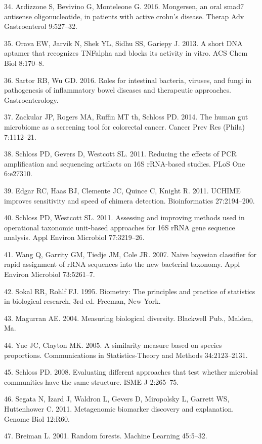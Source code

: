 \documentclass[11pt,]{article}
\begin{document}
\hypertarget{ref-ardizzone_mongersen_2016}{}
34. Ardizzone S, Bevivino G, Monteleone G. 2016. Mongersen, an oral
smad7 antisense oligonucleotide, in patients with active crohn's
disease. Therap Adv Gastroenterol 9:527--32.

\hypertarget{ref-orava_short_2013}{}
35. Orava EW, Jarvik N, Shek YL, Sidhu SS, Gariepy J. 2013. A short DNA
aptamer that recognizes TNFalpha and blocks its activity in vitro. ACS
Chem Biol 8:170--8.

\hypertarget{ref-sartor_microbesIBD_2016}{}
36. Sartor RB, Wu GD. 2016. Roles for intestinal bacteria, viruses, and
fungi in pathogenesis of inflammatory bowel diseases and therapeutic
approaches. Gastroenterology.

\hypertarget{ref-zackular_CRC_2014}{}
37. Zackular JP, Rogers MA, Ruffin MT th, Schloss PD. 2014. The human
gut microbiome as a screening tool for colorectal cancer. Cancer Prev
Res (Phila) 7:1112--21.

\hypertarget{ref-schloss_PCRartifacts_2011}{}
38. Schloss PD, Gevers D, Westcott SL. 2011. Reducing the effects of PCR
amplification and sequencing artifacts on 16S rRNA-based studies. PLoS
One 6:e27310.

\hypertarget{ref-edgar_uchime_2011}{}
39. Edgar RC, Haas BJ, Clemente JC, Quince C, Knight R. 2011. UCHIME
improves sensitivity and speed of chimera detection. Bioinformatics
27:2194--200.

\hypertarget{ref-schloss_OTUanalysis_2011}{}
40. Schloss PD, Westcott SL. 2011. Assessing and improving methods used
in operational taxonomic unit-based approaches for 16S rRNA gene
sequence analysis. Appl Environ Microbiol 77:3219--26.

\hypertarget{ref-wang_taxonomy_2007}{}
41. Wang Q, Garrity GM, Tiedje JM, Cole JR. 2007. Naive bayesian
classifier for rapid assignment of rRNA sequences into the new bacterial
taxonomy. Appl Environ Microbiol 73:5261--7.

\hypertarget{ref-sokal_biometrystats_1995}{}
42. Sokal RR, Rohlf FJ. 1995. Biometry: The principles and practice of
statistics in biological research, 3rd ed. Freeman, New York.

\hypertarget{ref-magurran_measuring_2004}{}
43. Magurran AE. 2004. Measuring biological diversity. Blackwell Pub.,
Malden, Ma.

\hypertarget{ref-yue_thetaYC_2005}{}
44. Yue JC, Clayton MK. 2005. A similarity measure based on species
proportions. Communications in Statistics-Theory and Methods
34:2123--2131.

\hypertarget{ref-schloss_commstruct_2008}{}
45. Schloss PD. 2008. Evaluating different approaches that test whether
microbial communities have the same structure. ISME J 2:265--75.

\hypertarget{ref-segata_biomarker_2011}{}
46. Segata N, Izard J, Waldron L, Gevers D, Miropolsky L, Garrett WS,
Huttenhower C. 2011. Metagenomic biomarker discovery and explanation.
Genome Biol 12:R60.

\hypertarget{ref-breiman_rf_2001}{}
47. Breiman L. 2001. Random forests. Machine Learning 45:5--32.
\end{document}
